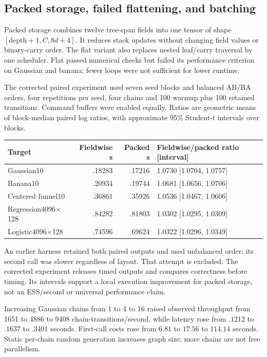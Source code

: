 \subsection{Packed storage, failed flattening, and batching}

Packed storage combines twelve tree-span fields into one tensor of shape
$[\text{depth}+1,C,8d+4]$. It reduces stack updates without changing
field values or binary-carry order. The flat variant also replaces nested
leaf/carry traversal by one scheduler. Flat passed numerical checks but
failed its performance criterion on Gaussian and banana; fewer loops
were not sufficient for lower runtime.

The corrected paired experiment used seven seed blocks and balanced AB/BA
orders, four repetitions per seed, four chains and 100 warmup plus 100
retained transitions. Command buffers were enabled equally. Ratios are
geometric means of block-median paired log ratios, with approximate 95\%
Student-$t$ intervals over blocks.

\begin{center}\small
\begin{tabular}{lrrl}
\toprule
Target & Fieldwise s & Packed s & Fieldwise/packed ratio [interval]\\
\midrule
Gaussian10 & .18283 & .17216 & 1.0730 [1.0704, 1.0757]\\
Banana10 & .20934 & .19744 & 1.0681 [1.0656, 1.0706]\\
Centered funnel10 & .36861 & .35926 & 1.0536 [1.0467, 1.0606]\\
Regression4096$\times$128 & .84282 & .81803 & 1.0302 [1.0295, 1.0309]\\
Logistic4096$\times$128 & .74596 & .69624 & 1.0322 [1.0296, 1.0349]\\
\bottomrule
\end{tabular}
\end{center}

An earlier harness retained both paired outputs and used unbalanced order;
its second call was slower regardless of layout. That attempt is excluded.
The corrected experiment releases timed outputs and compares correctness
before timing. Its intervals support a local execution improvement for
packed storage, not an ESS/second or universal performance claim.

Increasing Gaussian chains from 1 to 4 to 16 raised observed throughput
from 1651 to 4886 to 9408 chain-transitions/second, while latency rose
from $.1212$ to $.1637$ to $.3401$ seconds. First-call costs rose from
$6.81$ to $17.56$ to $114.14$ seconds. Static per-chain random generation
increases graph size; more chains are not free parallelism.

